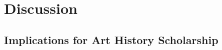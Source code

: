 \documentclass[10pt,twocolumn,letterpaper]{article}
\begin{document}



\section{Discussion}


\subsection{Implications for Art History Scholarship}


\end{document}
